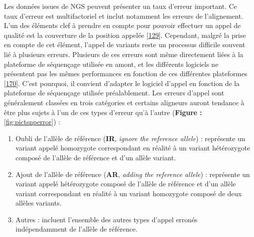 \documentclass[12pt,a4paper,twoside]{ugathesis}
\theoremstyle{definition}
\theoremstyle{definition}
\theoremstyle{definition}
\theoremstyle{remark}
\begin{document}
Les données issues de NGS peuvent présenter un taux d'erreur important.
Ce taux d'erreur est multifactoriel et inclut notamment les erreurs de
l'alignement. L'un des éléments clef à prendre en compte pour pouvoir
effectuer un appel de qualité est la couverture de la position appelée
{[}\protect\hyperlink{ref-Sims2014}{129}{]}. Cependant, malgré la prise
en compte de cet élément, l'appel de variants reste un processus
difficile souvent lié à plusieurs erreurs. Plusieurs de ces erreurs sont
même directement liées à la plateforme de séquençage utilisée en amont,
et les différents logiciels ne présentent pas les mêmes performances en
fonction de ces différentes plateformes
{[}\protect\hyperlink{ref-Hwang2015}{170}{]}. C'est pourquoi, il
convient d'adapter le logiciel d'appel en fonction de la plateforme de
séquençage utilisée préalablement. Les erreurs d'appel sont généralement
classées en trois catégories et certains aligneurs auront tendance à
être plus sujets à l'un de ces types d'erreur qu'à l'autre
(\textbf{Figure : }\ref{fig:pictsnperror}) :

\begin{enumerate}
\def\labelenumi{\arabic{enumi}.}
\item
  Oubli de l'allèle de référence (\textbf{IR}, \emph{ignore the
  reference allele}) : représente un variant appelé homozygote
  correspondant en réalité à un variant hétérozygote composé de l'allèle
  de référence et d'un allèle variant.
\item
  Ajout de l'allèle de référence (\textbf{AR}, \emph{adding the
  reference allele}) : représente un variant appelé hétérozygote composé
  de l'allèle de référence et d'un allèle variant correspondant en
  réalité à un variant homozygote composé de deux allèles variants.
\item
  Autres : incluent l'ensemble des autres types d'appel erronés
  indépendamment de l'allèle de référence.
\end{enumerate}

\newpage
\end{document}
